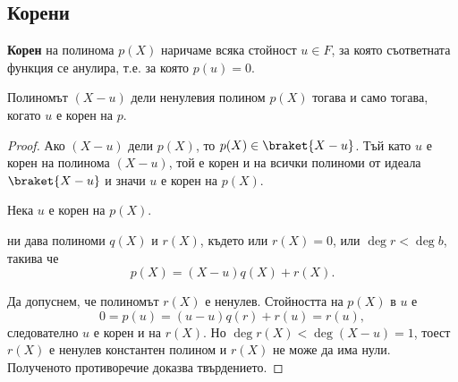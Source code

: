 \documentclass{../../common/topic}
\begin{document}
\subsection{Корени}

\begin{definition}
  \textbf{Корен} на полинома \( p(X) \) наричаме всяка стойност \( u \in F \), за която съответната функция се анулира, т.е. за която \( p(u) = 0 \).
\end{definition}

\begin{proposition}\label{thm:root_divisor}
  Полиномът \( (X - u) \) дели ненулевия полином \( p(X) \) тогава и само тогава, когато \( u \) е корен на \( p \).
\end{proposition}
\begin{proof}
  \SufficiencySubProof Ако \( (X - u) \) дели \( p(X) \), то \( p(X) \in \braket{X - u} \). Тъй като \( u \) е корен на полинома \( (X - u) \), той е корен и на всички полиноми от идеала \( \braket{X - u} \) и значи \( u \) е корен на \( p(X) \).

  \NecessitySubProof Нека \( u \) е корен на \( p(X) \).

   ни дава полиноми \( q(X) \) и \( r(X) \), където или \( r(X) = 0 \), или \( \deg r < \deg b \), такива че
  \begin{equation*}
    p(X) = (X - u) q(X) + r(X).
  \end{equation*}

  Да допуснем, че полиномът \( r(X) \) е ненулев. Стойността на \( p(X) \) в \( u \) е
  \begin{equation*}
    0 = p(u) = (u - u) q(r) + r(u) = r(u),
  \end{equation*}
  следователно \( u \) е корен и на \( r(X) \). Но \( \deg r(X) < \deg (X - u) = 1 \), тоест \( r(X) \) е ненулев константен полином и \( r(X) \) не може да има нули. Полученото противоречие доказва твърдението.
\end{proof}
\end{document}
